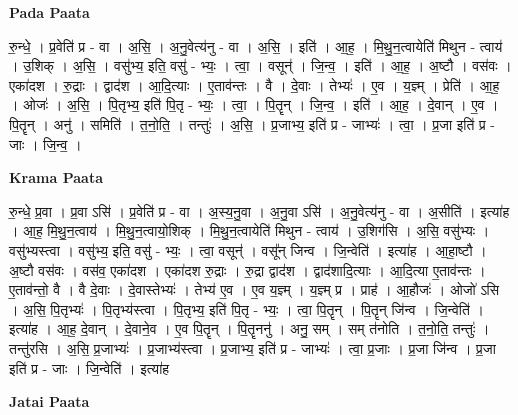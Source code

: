 \documentclass[17pt]{extarticle}
\begin{document}
\textbf{Pada Paata} \newline

रु॒न्धे॒ । प्र॒वेति॑ प्र - वा । अ॒सि॒ । अ॒नु॒वेत्य॑नु - वा । अ॒सि॒ । इति॑ । आ॒ह॒ । मि॒थु॒न॒त्वायेति॑ मिथुन - त्वाय॑ । उ॒शिक् । अ॒सि॒ । वसु॑भ्य॒ इति॒ वसु॑ - भ्यः॒ । त्वा॒ । वसून्॑ । जि॒न्व॒ । इति॑ । आ॒ह॒ । अ॒ष्टौ । वस॑वः । एका॑दश । रु॒द्राः । द्वाद॑श । आ॒दि॒त्याः । ए॒ताव॑न्तः । वै । दे॒वाः । तेभ्यः॑ । ए॒व । य॒ज्ञ्म् । प्रेति॑ । आ॒ह॒ । ओजः॑ । अ॒सि॒ । पि॒तृभ्य॒ इति॑ पि॒तृ - भ्यः॒ । त्वा॒ । पि॒तॄन् । जि॒न्व॒ । इति॑ । आ॒ह॒ । दे॒वान् । ए॒व । पि॒तॄन् । अनु॑ । समिति॑ । त॒नो॒ति॒ । तन्तुः॑ । अ॒सि॒ । प्र॒जाभ्य॒ इति॑ प्र - जाभ्यः॑ । त्वा॒ । प्र॒जा इति॑ प्र - जाः । जि॒न्व॒ ।  \newline


\textbf{Krama Paata} \newline

रु॒न्धे॒ प्र॒वा । प्र॒वा ऽसि॑ । प्र॒वेति॑ प्र - वा । अ॒स्य॒नु॒वा । अ॒नु॒वा ऽसि॑ । अ॒नु॒वेत्य॑नु - वा । अ॒सीति॑ । इत्या॑ह । आ॒ह॒ मि॒थु॒न॒त्वाय॑ । मि॒थु॒न॒त्वायो॒शिक् । मि॒थु॒न॒त्वायेति॑ मिथुन - त्वाय॑ । उ॒शिग॑सि । अ॒सि॒ वसु॑भ्यः । वसु॑भ्यस्त्वा । वसु॑भ्य॒ इति॒ वसु॑ - भ्यः॒ । त्वा॒ वसून्॑ । वसू᳚न् जिन्व । जि॒न्वेति॑ । इत्या॑ह । आ॒हा॒ष्टौ । अ॒ष्टौ वस॑वः । वस॑व॒ एका॑दश । एका॑दश रु॒द्राः । रु॒द्रा द्वाद॑श । द्वाद॑शादि॒त्याः । आ॒दि॒त्या ए॒ताव॑न्तः । ए॒ताव॑न्तो॒ वै । वै दे॒वाः । दे॒वास्तेभ्यः॑ । तेभ्य॑ ए॒व । ए॒व य॒ज्ञ्म् । य॒ज्ञ्म् प्र । प्राह॑ । आ॒हौजः॑ । ओजो॑ ऽसि । अ॒सि॒ पि॒तृभ्यः॑ । पि॒तृभ्य॑स्त्वा । पि॒तृभ्य॒ इति॑ पि॒तृ - भ्यः॒ । त्वा॒ पि॒तॄन् । पि॒तॄन् जि॑न्व । जि॒न्वेति॑ । इत्या॑ह । आ॒ह॒ दे॒वान् । दे॒वाने॒व । ए॒व पि॒तॄन् । पि॒तॄननु॑ । अनु॒ सम् । सम् त॑नोति । त॒नो॒ति॒ तन्तुः॑ । तन्तु॑रसि । अ॒सि॒ प्र॒जाभ्यः॑ । प्र॒जाभ्य॑स्त्वा । प्र॒जाभ्य॒ इति॑ प्र - जाभ्यः॑ । त्वा॒ प्र॒जाः । प्र॒जा जि॑न्व । प्र॒जा इति॑ प्र - जाः । जि॒न्वेति॑ । इत्या॑ह \newline

\textbf{Jatai Paata} \newline
\end{document}
